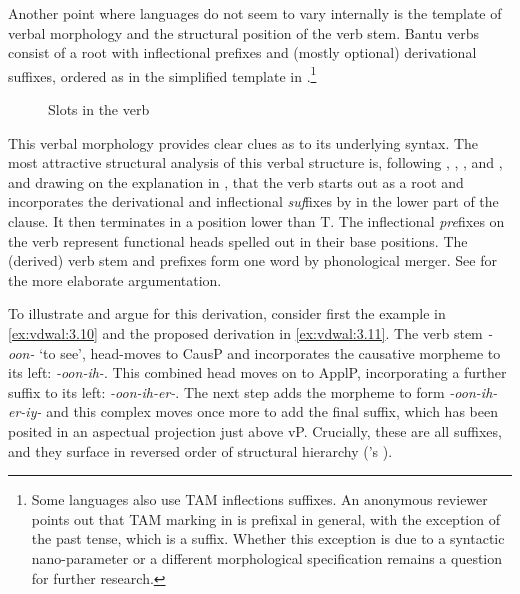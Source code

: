 \documentclass[output=paper]{langsci/langscibook}
\begin{document}
Another point where  languages do not seem to vary internally is the
template of verbal morphology and the structural position of the verb stem.
Bantu verbs consist of a root with inflectional prefixes and (mostly optional)
derivational suffixes, ordered as in the simplified template in
.\footnote{Some  languages also use \gls{TAM} inflections
    suffixes. An anonymous reviewer points out that \gls{TAM} marking in
     is prefixal in general, with the exception of the past tense,
    which is a suffix.  Whether this exception is due to a syntactic
nano-parameter or a different morphological specification remains a question
for further research.}\largerpage[-2]

\begin{figure}[H]
    \caption{Slots in the  verb}\label{fig:vdwal:1}
\end{figure}

This verbal morphology provides clear clues as to its underlying syntax. The
most attractive structural analysis of this verbal structure is, following
\citet{Myers1990}, \citet{Julien2002}, \citet{Kinyalolo2003},
\citet{Carstens2005} and \citet{Buell2005}, and drawing on the explanation in
\textcite{vanderWal2009}, that the verb starts out as a root and incorporates
the derivational and inflectional \emph{suf}fixes by  in the
lower part of the clause.  It then terminates in a position lower than T. The
inflectional \emph{pre}fixes on the verb represent functional heads spelled out
in their base positions. The (derived) verb stem and prefixes form one word by
phonological merger. See \citet{Julien2002} for the more elaborate
argumentation.\largerpage

To illustrate and argue for this derivation, consider first the 
example in \eqref{ex:vdwal:3.10} and the proposed derivation in
\eqref{ex:vdwal:3.11}. The verb stem \emph{-oon-} ‘to see’, head-moves to CausP
and incorporates the causative morpheme to its left: \emph{-oon-ih-}. This
combined head moves on to ApplP, incorporating a further suffix to its left:
\emph{-oon-ih-er-}. The next step adds the  morpheme to form
\emph{-oon-ih-er-iy-} and this complex moves once more to add the final suffix,
which has been posited in an aspectual projection just above vP. Crucially,
these are all suffixes, and they surface in reversed order of structural
hierarchy (\citeauthor{Baker1988}'s \citeyear{Baker1988} ).
\end{document}
